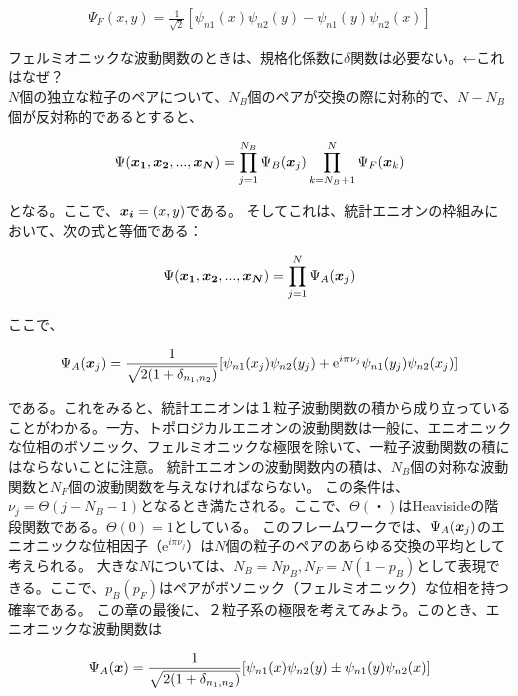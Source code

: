 \documentclass[a4paper,11pt]{jsarticle}
\numberwithin{equation}{section}
\begin{document}
\begin{align}
  \Psi_F(x,y) = \frac{1}{\sqrt{2}}[\psi_{n1}(x)\psi_{n2}(y)-\psi_{n1}(y)\psi_{n2}(x)]
\end{align}

フェルミオニックな波動関数のときは、規格化係数に$\delta$関数は必要ない。←これはなぜ？\\
$N$個の独立な粒子のペアについて、$N_B$個のペアが交換の際に対称的で、$N-N_B$個が反対称的であるとすると、

\begin{align}
\Psi(\vb*{x_1},\vb*{x_2},...,\vb*{x_N})=\prod_{j=1}^{N_B}\Psi_B(\vb*{x}_j)\prod_{k=N_B+1}^{N}\Psi_F(\vb*{x}_k)
\end{align}

となる。ここで、$\vb*{x_i}=(x,y)$である。
そしてこれは、統計エニオンの枠組みにおいて、次の式と等価である：

\begin{align}
  \Psi(\vb*{x_1},\vb*{x_2},...,\vb*{x_N})=\prod_{j=1}^{N}\Psi_A(\vb*{x}_j)
\end{align}

ここで、

\begin{align}
\Psi_A(\vb*{x}_j)=\frac{1}{\sqrt{2(1+\delta_{n_1,n_2})}}[\psi_{n1}(x_j)\psi_{n2}(y_j)+\mathrm{e}^{i\pi\nu_j}\psi_{n1}(y_j)\psi_{n2}(x_j)]
\end{align}

である。これをみると、統計エニオンは１粒子波動関数の積から成り立っていることがわかる。一方、トポロジカルエニオンの波動関数は一般に、エニオニックな位相のボソニック、フェルミオニックな極限を除いて、一粒子波動関数の積にはならないことに注意。
統計エニオンの波動関数内の積は、$N_B$個の対称な波動関数と$N_F$個の波動関数を与えなければならない。
この条件は、$\nu_j=\Theta(j-N_B-1)$となるとき満たされる。ここで、$\Theta(・)$はHeavisideの階段関数である。$\Theta(0)=1$としている。
このフレームワークでは、$\Psi_A(\vb*{x}_j)$のエニオニックな位相因子（$\mathrm{e}^{i\pi\nu_j}$）は$N$個の粒子のペアのあらゆる交換の平均として考えられる。
大きな$N$については、$N_B=Np_B,N_F=N(1-p_B)$として表現できる。ここで、$p_B(p_F)$はペアがボソニック（フェルミオニック）な位相を持つ確率である。
この章の最後に、２粒子系の極限を考えてみよう。このとき、エニオニックな波動関数は

\begin{align}
  \Psi_A(\vb*{x})=\frac{1}{\sqrt{2(1+\delta_{n_1,n_2})}}[\psi_{n1}(x)\psi_{n2}(y)\pm \psi_{n1}(y)\psi_{n2}(x)]
\end{align}
\end{document}
